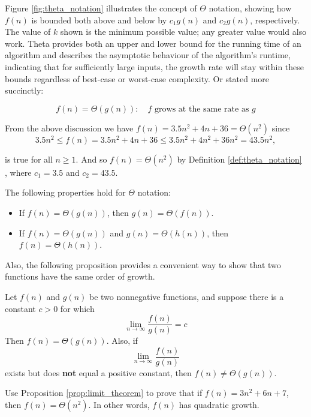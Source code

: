 Figure \ref{fig:theta_notation} illustrates the concept of $\Theta$ notation, showing how $f(n)$ is bounded both above and below by $c_1 g(n)$ and $c_2 g(n)$, respectively. The value of $k$ shown is the minimum possible value; any greater value would also work. Theta provides both an upper and lower bound for the running time of an algorithm and describes the asymptotic behaviour of the algorithm’s runtime, indicating that for sufficiently large inputs, the growth rate will stay within these bounds regardless of best-case or worst-case complexity. Or stated more succinctly:

\[
f(n)=\Theta(g(n)): \quad f \text { grows at the same rate as } g
\]

\begin{example}

    From the above discussion we have $f(n)=3.5 n^2+4 n+36=\Theta\left(n^2\right)$ since
    \[
    3.5 n^2 \leq f(n)=3.5 n^2+4 n+36 \leq 3.5 n^2+4 n^2+36 n^2=43.5 n^2,
    \]

is true for all $n \geq 1$. And so $f(n)=\Theta\left(n^2\right)$ by Definition \ref{def:theta_notation} , where $c_1=3.5$ and $c_2=43.5$.
\end{example}

The following properties hold for $\Theta$ notation:

\begin{itemize}
    \item If $f(n) = \Theta(g(n))$, then $g(n) = \Theta(f(n))$.
    \item If $f(n) = \Theta(g(n))$ and $g(n) = \Theta(h(n))$, then $f(n) = \Theta(h(n))$.
\end{itemize}

Also, the following proposition provides a convenient way to show that two functions have the same
order of growth.

\begin{proposition} \label{prop:limit_theorem}
    Let $f(n)$ and $g(n)$ be two nonnegative functions, and suppose there is a constant $c>0$ for which
    \medskip
    \[
    \lim _{n \rightarrow \infty} \frac{f(n)}{g(n)}=c
    \]
    \medskip
    Then $f(n)=\Theta(g(n))$. Also, if
    \medskip
    \[
    \lim _{n \rightarrow \infty} \frac{f(n)}{g(n)}
    \]
    \medskip
    exists but does \textbf{not} equal a positive constant, then $f(n) \neq \Theta(g(n))$.
\end{proposition}

\begin{example}
    Use Proposition \ref{prop:limit_theorem} to prove that if $f(n)=3 n^2+6 n+7$, then $f(n)=\Theta\left(n^2\right)$. In other words, $f(n)$ has quadratic growth.
\end{example}

